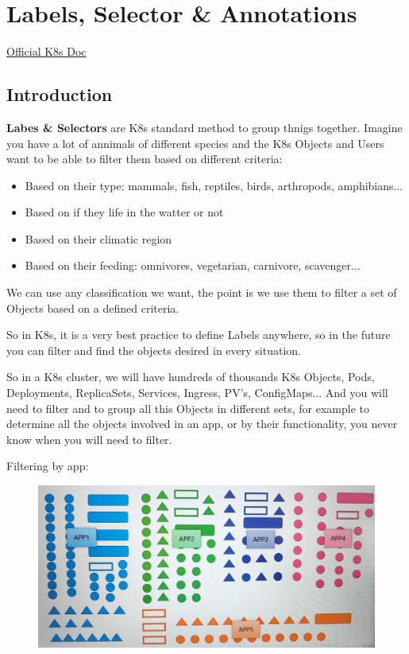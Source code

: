 \documentclass{article}
\begin{document}
\newpage
\section{Labels, Selector \& Annotations}

\href{https://kubernetes.io/docs/concepts/overview/working-with-objects/labels/}{Official K8s Doc}

\subsection{Introduction}

\textbf{Labes \& Selectors} are K8s standard method to group thnigs together. Imagine you have a lot of annimals of different species and the K8s Objects and Users want to be able  to filter them based on different criteria: 

\begin{itemize}
    \item Based on their type: mammals, fish, reptiles, birds, arthropods, amphibians...
    \item Based on if they life in the watter or not
    \item Based on their climatic region
    \item Based on their feeding: omnivores, vegetarian, carnivore, scavenger...
\end{itemize}

We can use any classification we want, the point is we use them to filter a set of Objects based on a defined criteria.

So in K8s, it is a very best practice to define Labels anywhere, so in the future you can filter and find the objects desired in every situation.

So in a K8s cluster, we will have hundreds of thousands K8s Objects, Pods, Deployments, ReplicaSets, Services, Ingress, PV's, ConfigMaps... And you will need to filter and to group all this Objects in different sets, for example to determine all the objects involved in an app, or by their functionality, you never know when you will need to filter.

Filtering by app:

\begin{figure}[H]
    \centering
    \includegraphics[width=\textwidth]{pictures/sch4.jpg}
\end{figure}
\end{document}
